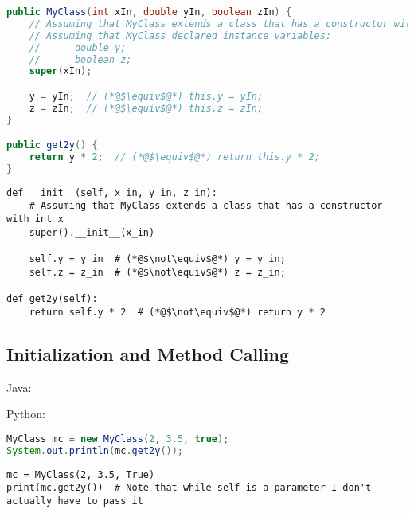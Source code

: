 \documentclass{article}
\begin{document}
\begin{minipage}{0.45\linewidth}
    \begin{lstlisting}[language=Java]
public MyClass(int xIn, double yIn, boolean zIn) {
    // Assuming that MyClass extends a class that has a constructor with int x
    // Assuming that MyClass declared instance variables:
    //      double y;
    //      boolean z;
    super(xIn);

    y = yIn;  // (*@$\equiv$@*) this.y = yIn;
    z = zIn;  // (*@$\equiv$@*) this.z = zIn;
}

public get2y() {
    return y * 2;  // (*@$\equiv$@*) return this.y * 2;
}
     \end{lstlisting}
\end{minipage}
\hfill
\begin{minipage}{0.45\linewidth}
    \begin{lstlisting}
def __init__(self, x_in, y_in, z_in):
    # Assuming that MyClass extends a class that has a constructor with int x
    super().__init__(x_in)

    self.y = y_in  # (*@$\not\equiv$@*) y = y_in;
    self.z = z_in  # (*@$\not\equiv$@*) z = z_in;

def get2y(self):
    return self.y * 2  # (*@$\not\equiv$@*) return y * 2
    \end{lstlisting}
\end{minipage}

\subsection{Initialization and Method Calling}
\begin{minipage}{0.45\linewidth}
    Java:
\end{minipage}
\hfill
\begin{minipage}{0.45\linewidth}
    Python:
\end{minipage}

\begin{minipage}{0.45\linewidth}
    \begin{lstlisting}[language=Java]
MyClass mc = new MyClass(2, 3.5, true);
System.out.println(mc.get2y());
     \end{lstlisting}
\end{minipage}
\hfill
\begin{minipage}{0.45\linewidth}
    \begin{lstlisting}
mc = MyClass(2, 3.5, True)
print(mc.get2y())  # Note that while self is a parameter I don't actually have to pass it
    \end{lstlisting}
\end{minipage}
\end{document}
